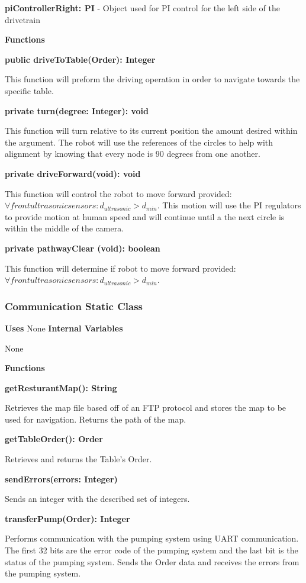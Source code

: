 \documentclass [10pt]{article}
\begin{document}
\textbf{piControllerRight: PI} - Object used for PI control for the left side of the drivetrain

\textbf{Functions}

\textbf{public driveToTable(Order): Integer}

This function will preform the driving operation in order to navigate towards the specific table.

\textbf{private turn(degree: Integer): void}

This function will turn relative to its current position the amount desired within the argument. The robot will use the references of the circles to help with alignment by knowing that every node is 90 degrees from one another.

\textbf{private driveForward(void): void}

This function will control the robot to move forward provided: $ \forall front ultrasonic sensors: d_{ultrasonic} > d_{min} $. This motion will use the PI regulators to provide motion at human speed and will continue until a the next circle is within the middle of the camera.

\textbf{private pathwayClear (void): boolean}

This function will determine if robot to move forward provided: $ \forall front ultrasonic sensors: d_{ultrasonic} > d_{min} $. 

\subsubsection{Communication Static Class}
\textbf{Uses}
None 
\textbf{Internal Variables}

None 

\textbf{Functions}

\textbf{getResturantMap(): String}

Retrieves the map file based off of an FTP protocol and stores the map to be used for navigation. Returns the path of the map.

\textbf{getTableOrder(): Order}

Retrieves and returns the Table's Order.

\textbf{sendErrors(errors: Integer)}

 Sends an integer with the described set of integers. 
 
\textbf{transferPump(Order): Integer}

 Performs communication with the pumping system using UART communication. The first 32 bits are the error code of the pumping system and the last bit is the status of the pumping system. Sends the Order data and receives the errors from the pumping system.
\end{document}
